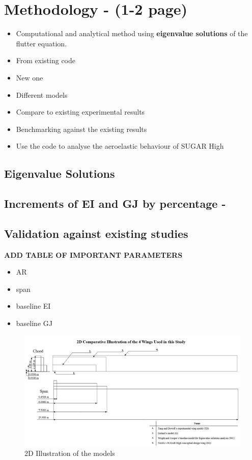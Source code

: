 \documentclass[11pt]{article}
\begin{document}
\section{Methodology - (1-2 page)}
\begin{itemize}
    \item Computational and analytical method using \textbf{eigenvalue solutions} of the flutter equation.
    \item From existing code
    \item New one
    \item Different models
    \item Compare to existing experimental results
    \item Benchmarking against the existing results
    \item Use the code to analyse the aeroelastic behaviour of SUGAR High
\end{itemize}
\subsection{Eigenvalue Solutions}

\subsection{Increments of EI and GJ by percentage - \cite{MohammedFREEWINGS}}

\subsection{Validation against existing studies}
\textbf{ADD TABLE OF IMPORTANT PARAMETERS}
\begin{itemize}
    \item AR
    \item span
    \item baseline EI
    \item baseline GJ
\end{itemize}

\begin{figure}[H]
    \centering
    \includegraphics[width = \textwidth]{figures/para.png}
    \caption{2D Illustration of the models}
    \label{fig:2D-wings}
\end{figure}
\end{document}
